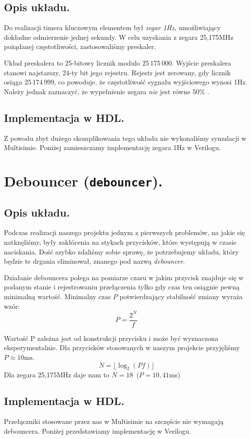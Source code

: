 \documentclass[a4paper,oneside]{report}
\newcommand{\clocksec}{\texttt{clock\textunderscore sec}}
\newcommand{\debouncer}{\texttt{debouncer}}
\begin{document}
\subsection{Opis układu.}
Do realizacji timera kluczowym elementem był \emph{zegar 1Hz},
umożliwiający dokładne odmierzenie jednej sekundy. 
W celu uzyskania z zegara 25,175MHz pożądanej częstotliwości, 
zastosowaliśmy preskaler.

Układ preskalera to 25-bitowy licznik modulo 25\,175\,000. 
Wyjście preskalera stanowi najstarszy, 24-ty bit jego rejestru. 
Rejestr jest zerowany, gdy licznik osiąga 25\,174\,999, co powoduje, że
częstotliwość sygnału wyjściowego wynosi 1Hz. Należy jednak
zaznaczyć, że wypełnienie zegara \emph{nie} jest równe 50\% .

\subsection{Implementacja w HDL.}
Z powodu zbyt dużego skomplikowania tego układu nie wykonaliśmy
symulacji w Multisimie. Poniżej zamieszczamy implementację zegara
1Hz w Verilogu.


\section{Debouncer (\debouncer).}
\subsection{Opis układu.}
Podczas realizacji naszego projektu jednym z pierwszych problemów,
na jakie się natknęliśmy, były zakłócenia na stykach przycisków,
które występują w czasie naciskania. Dość szybko zdaliśmy sobie
sprawę, że potrzebujemy układu, który będzie te drgania eliminował,
znanego pod nazwą \emph{debouncer}.

Działanie debouncera polega na pomiarze czasu w jakim przycisk 
znajduje się w podanym stanie i rejestrowaniu przełączenia tylko 
gdy czas ten osiągnie pewną minimalną wartość. 
Minimalny czas $P$ potwierdzający stabilność zmiany wyraża wzór:
$$ 
P = \frac{2^N}{f} 
$$

Wartość P zależna jest od konstrukcji przycisku i może być wyznaczona
eksperymentalnie. Dla przycisków stosowanych w naszym projekcie przyjęliśmy
$P \approx 10\mathrm{ms}$.
$$
N = \lfloor\log_2(Pf)\rfloor
$$
Dla zegara 25,175MHz daje nam to $N=18$\ ($P=10,41$ms)
\subsection{Implementacja w HDL.}
Przełączniki stosowane przez nas w Multisimie na szczęście nie wymagają
debouncera. Poniżej przedstawiamy implementację w Verilogu.
\end{document}
